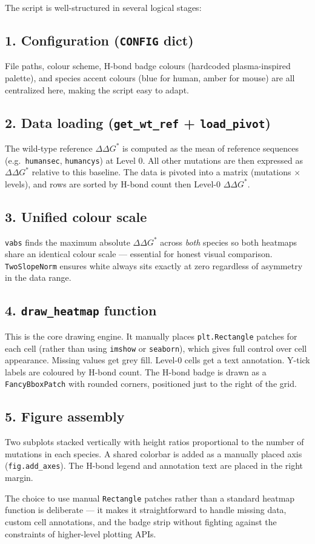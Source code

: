 \documentclass[12pt]{article}
\begin{document}
The script is well-structured in several logical stages:

\subsection*{1. Configuration (\texttt{CONFIG} dict)}

File paths, colour scheme, H-bond badge colours (hardcoded plasma-inspired palette), and species accent colours (blue for human, amber for mouse) are all centralized here, making the script easy to adapt.

\subsection*{2. Data loading (\texttt{get\_wt\_ref} + \texttt{load\_pivot})}

The wild-type reference $\Delta\Delta G^{*}$ is computed as the mean of reference sequences (e.g.\ \texttt{humansec}, \texttt{humancys}) at Level 0. All other mutations are then expressed as $\Delta\Delta G^{*}$ relative to this baseline. The data is pivoted into a matrix (mutations $\times$ levels), and rows are sorted by H-bond count then Level-0 $\Delta\Delta G^{*}$.

\subsection*{3. Unified colour scale}

\texttt{vabs} finds the maximum absolute $\Delta\Delta G^{*}$ across \emph{both} species so both heatmaps share an identical colour scale --- essential for honest visual comparison. \texttt{TwoSlopeNorm} ensures white always sits exactly at zero regardless of asymmetry in the data range.

\subsection*{4. \texttt{draw\_heatmap} function}

This is the core drawing engine. It manually places \texttt{plt.Rectangle} patches for each cell (rather than using \texttt{imshow} or \texttt{seaborn}), which gives full control over cell appearance. Missing values get grey fill. Level-0 cells get a text annotation. Y-tick labels are coloured by H-bond count. The H-bond badge is drawn as a \texttt{FancyBboxPatch} with rounded corners, positioned just to the right of the grid.

\subsection*{5. Figure assembly}

Two subplots stacked vertically with height ratios proportional to the number of mutations in each species. A shared colorbar is added as a manually placed axis (\texttt{fig.add\_axes}). The H-bond legend and annotation text are placed in the right margin.

The choice to use manual \texttt{Rectangle} patches rather than a standard heatmap function is deliberate --- it makes it straightforward to handle missing data, custom cell annotations, and the badge strip without fighting against the constraints of higher-level plotting APIs.
\end{document}
